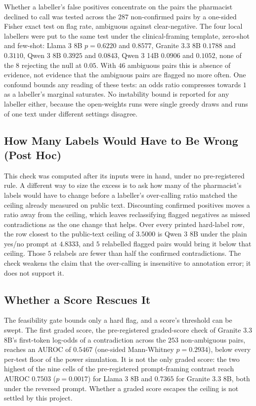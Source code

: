 Whether a labeller's false positives concentrate on the pairs the
pharmacist declined to call was tested across the $287$ non-confirmed pairs by
a one-sided Fisher exact test on flag rate, ambiguous against clear-negative. The
four local labellers were put to the same test under the clinical-framing
template, zero-shot and few-shot: Llama 3 8B $p = 0.6220$ and
$0.8577$, Granite 3.3 8B $0.1788$ and $0.3110$, Qwen 3 8B
$0.3925$ and $0.0843$, Qwen 3 14B $0.0906$ and $0.1052$, none of the
8 rejecting the null at $0.05$. With
$46$ ambiguous pairs this is absence of evidence, not evidence that the
ambiguous pairs are flagged no more often. One confound bounds any reading of these tests: an odds ratio
compresses towards $1$ as a labeller's marginal saturates. No instability bound is
reported for any labeller either, because the open-weights runs were single greedy
draws and runs of one text under different settings disagree.

\subsection{How Many Labels Would Have to Be Wrong (Post Hoc)}

This check was computed after its inputs were
in hand, under no pre-registered rule. A different way to size the excess is to ask how many of the pharmacist's
labels would have to change before a labeller's over-calling ratio matched the
ceiling already measured on public text. Discounting confirmed positives
moves a ratio away from the ceiling, which leaves reclassifying flagged negatives
as missed contradictions as the one change that helps. Over every printed hard-label row, the row
closest to the public-text ceiling of $3.5000$ is Qwen 3 8B under the
plain yes/no prompt at $4.8333$, and $5$ relabelled flagged pairs would bring
it below that ceiling. Those $5$ relabels are fewer than half the confirmed
contradictions. The check weakens the claim that the over-calling is insensitive to
annotation error; it does not support it.

\subsection{Whether a Score Rescues It}
\label{sec:r-score}

The feasibility gate bounds only a hard flag, and a score's threshold can be
swept. The first graded score, the pre-registered
graded-score check of Granite 3.3 8B's first-token log-odds of a contradiction across the $253$ non-ambiguous
pairs, reaches an AUROC of $0.5467$ (one-sided Mann-Whitney $p = 0.2934$),
below every per-test floor of the power simulation. It is not the only graded score: the two highest of the
nine cells of the pre-registered prompt-framing contrast reach AUROC $0.7503$
($p = 0.0017$) for Llama 3 8B and $0.7365$ for Granite 3.3 8B,
both under the reversed prompt. Whether a graded score escapes the ceiling
is not settled by this project.

